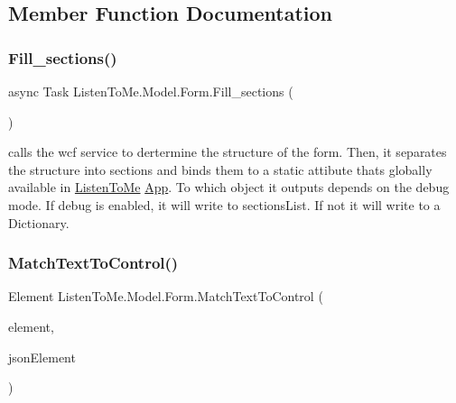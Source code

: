 \subsection{Member Function Documentation}
\mbox{\label{class_listen_to_me_1_1_model_1_1_form_a97e6f2c705e11c7c99b8742d846d8738}} 
\subsubsection{\texorpdfstring{Fill\+\_\+sections()}{Fill\_sections()}}
{\footnotesize\ttfamily async Task Listen\+To\+Me.\+Model.\+Form.\+Fill\+\_\+sections (\begin{DoxyParamCaption}{ }\end{DoxyParamCaption})}



calls the wcf service to dertermine the structure of the form. Then, it separates the structure into sections and binds them to a static attibute that\textquotesingle{}s globally available in \mbox{\hyperlink{namespace_listen_to_me}{Listen\+To\+Me}} \mbox{\hyperlink{class_listen_to_me_1_1_app}{App}}. To which object it outputs depends on the debug mode. If debug is enabled, it will write to sections\+List. If not it will write to a Dictionary. 

\mbox{\label{class_listen_to_me_1_1_model_1_1_form_a6a232d7bcb2cff3bd69cdb149c3dd485}} 
\subsubsection{\texorpdfstring{Match\+Text\+To\+Control()}{MatchTextToControl()}}
{\footnotesize\ttfamily Element Listen\+To\+Me.\+Model.\+Form.\+Match\+Text\+To\+Control (\begin{DoxyParamCaption}\item[{U\+I\+Element}]{element,  }\item[{Element}]{json\+Element }\end{DoxyParamCaption})\hspace{0.3cm}{\ttfamily [private]}}



